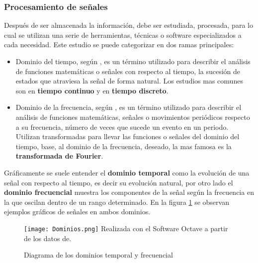 \subsubsection{Procesamiento de señales}

Después de ser almacenada la información, debe ser estudiada, procesada, para lo
cual se utilizan una serie de herramientas, técnicas o software especializados
a cada necesidad. Este estudio se puede categorizar en dos ramas principales:

\begin{itemize}
    \item Dominio del tiempo, según \cite{wiki:DominioTiempo}, es un término
        utilizado para describir el análisis
        de funciones matemáticas o señales con respecto al tiempo, la sucesión
        de estados que atraviesa la señal de forma natural. Los estudios mas
        comunes son en  \textbf{tiempo continuo} y en \textbf{tiempo discreto}.

    \item Dominio de la frecuencia, según \cite{wiki:DominioFrecuencia}, es un
        término utilizado para describir el análisis
        de funciones matemáticas, señales o movimientos periódicos respecto a
        su frecuencia, número de veces que sucede un evento en un periodo.
        Utilizan transformadas para llevar las funciones o señales del dominio
        del tiempo, base, al dominio de la frecuencia, deseado, la mas famosa es
        la \textbf{transformada de Fourier}.
\end{itemize}


Gráficamente se suele entender el \textbf{dominio temporal} como la evolución
de una señal con respecto al tiempo, es decir su evolución natural, por otro
lado el \textbf{dominio frecuencial} muestra los componentes de la señal según
la frecuencia en la que oscilan dentro de un rango determinado.
En la figura \ref{Dominios} se observan ejemplos gráficos de señales en ambos
dominios.

	\begin{figure}[htb]
		\centering
        \caption{ Diagrama de los dominios temporal y frecuencial}
        \texttt{[image: Dominios.png]}
        Realizada con el Software Octave a partir de los datos de.
                \Cite{HUANG20181745}
        \label{Dominios}

	\end{figure}


